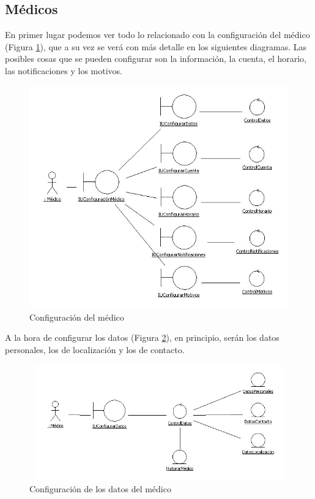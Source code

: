 
\newpage
\subsection{Médicos} %
\label{ssub:medicos}

	En primer lugar podemos ver todo lo relacionado con la configuración del médico (Figura \ref{fig:col_clase1}), que a su vez se verá con más detalle en los siguientes diagramas. Las posibles cosas que se pueden configurar son la información, la cuenta, el horario, las notificaciones y los motivos.
	\begin{figure}[H]
	  \centering
	    \includegraphics[width=16cm]{img/jpg/clases/1_MedicoConfiguracion.jpg}
	  \caption{Configuración del médico}
	  \label{fig:col_clase1}
	\end{figure}
	
	\newpage
	A la hora de configurar los datos (Figura \ref{fig:col_clase2}), en principio, serán los datos personales, los de localización y los de contacto.
	\begin{figure}[H]
	  \centering
	    \includegraphics[width=12cm, height=5cm]{img/jpg/clases/2_MedicosConfiguracionDatos.jpg}
	  \caption{Configuración de los datos del médico}
	  \label{fig:col_clase2}
	\end{figure}

